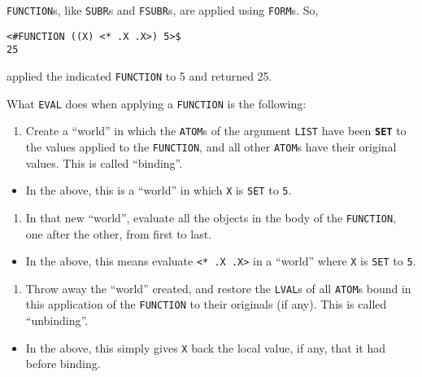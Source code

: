 \documentclass[a4paper]{scrbook}
\providecommand{\tightlist}{%
  \setlength{\itemsep}{0pt}\setlength{\parskip}{0pt}}
\begin{document}
\texttt{FUNCTION}s, like \texttt{SUBR}s and \texttt{FSUBR}s, are applied using \texttt{FORM}s. So,

\begin{verbatim}
<#FUNCTION ((X) <* .X .X>) 5>$
25
\end{verbatim}

applied the indicated \texttt{FUNCTION} to 5 and returned 25.

What \texttt{EVAL} does when applying a \texttt{FUNCTION} is the following:

\begin{enumerate}
\def\labelenumi{\arabic{enumi}.}
\tightlist
\item
  Create a ``world'' in which the \texttt{ATOM}s of the argument \texttt{LIST} have been \textbf{\texttt{SET}}
   to the values applied to the \texttt{FUNCTION}, and all other \texttt{ATOM}s have their original
  values. This is called ``binding''.
\end{enumerate}

\begin{itemize}
\tightlist
\item
  In the above, this is a ``world'' in which \texttt{X} is \texttt{SET} to \texttt{5}.
\end{itemize}

\begin{enumerate}
\def\labelenumi{\arabic{enumi}.}
\setcounter{enumi}{1}
\tightlist
\item
  In that new ``world'', evaluate all the objects in the body of the \texttt{FUNCTION}, one after the other, from first to
  last.
\end{enumerate}

\begin{itemize}
\tightlist
\item
  In the above, this means evaluate \texttt{\textless{}*\ .X\ .X\textgreater{}} in a ``world'' where \texttt{X} is
  \texttt{SET} to \texttt{5}.
\end{itemize}

\begin{enumerate}
\def\labelenumi{\arabic{enumi}.}
\setcounter{enumi}{2}
\tightlist
\item
  Throw away the ``world'' created, and restore the \texttt{LVAL}s of all \texttt{ATOM}s bound in this
  application of the \texttt{FUNCTION} to their originals (if any). This is called ``unbinding''.
\end{enumerate}

\begin{itemize}
\tightlist
\item
  In the above, this simply gives \texttt{X} back the local value, if any, that it had before binding.
\end{itemize}
\end{document}
